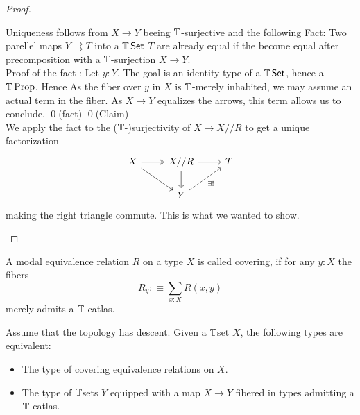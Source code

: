 \begin{proof}
\begin{itemize}
		Uniqueness follows from $X \to Y$ beeing $\mathbb{T}$-surjective and the following
		Fact: Two parellel maps $Y \rightrightarrows T$ into a $\mathbb{T} \operatorname{\mathsf {Set}}$ $T$ are already equal if the become equal after precomposition with a $\mathbb{T}$-surjection $X \to Y$.  \\
		Proof of the fact : Let $y : Y$. The goal is an identity type of a $\mathbb{T} \operatorname{\mathsf {Set}}$, hence a $\mathbb{T} \operatorname{Prop}$. Hence As the fiber over $y$ in $X$ is $\mathbb{T}$-merely inhabited, we may assume an actual term in the fiber. 	As $X \to Y$ equalizes the arrows, this term allows us to conclude. \qed (fact)	\qed(Claim) \\
		We apply the fact to the ($\mathbb{T}$-)surjectivity of $X \to X // R $ to get a unique factorization 
		\[\begin{tikzcd}
			X & {X // R} & T \\
			& Y
			\arrow[two heads, from=1-1, to=1-2]
			\arrow[from=1-1, to=2-2]
			\arrow[from=1-2, to=1-3]
			\arrow[from=1-2, to=2-2]
			\arrow["{\exists!}"', dashed, from=2-2, to=1-3]
		\end{tikzcd}\]
		making the right triangle commute. This is what we wanted to show.
	\end{itemize}
\end{proof}

\begin{definition}
	A modal equivalence relation $R$ on a type $X$ is called covering, if for any $y:X$ the fibers
	\[R_y :\equiv \sum_{x:X} R(x,y)\]
	merely admits a $\mathbb{T}$-catlas.
	
\end{definition}

\begin{lemma}{\label{lemma:fundamental-property-algebraic-spaces}}
	Assume that the topology has descent.
	Given a $\mathbb{T}$set $X$, the following types are equivalent:
	\begin{itemize}
		\item The type of covering equivalence relations on $X$.
		\item The type of $\mathbb{T}$sets $Y$ equipped with a map $X \to Y$ fibered in types admitting a $\mathbb{T}$-catlas.
	\end{itemize}
\end{lemma}


